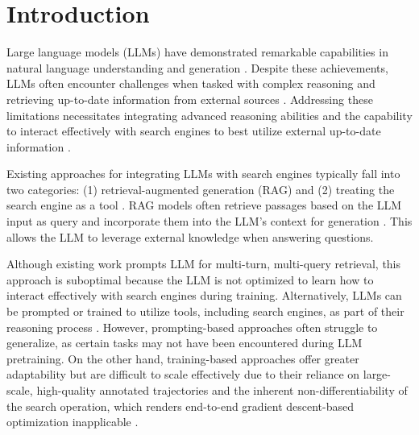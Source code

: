 \section{Introduction}

Large language models (LLMs) have demonstrated remarkable capabilities in natural language understanding and generation \citep{hendrycks2020measuring,clark2018think}.
Despite these achievements, LLMs often encounter challenges when tasked with complex reasoning \citep{wei2022chain} and retrieving up-to-date information from external sources \citep{jin2024long}. Addressing these limitations necessitates integrating advanced reasoning abilities \citep{huang2022towards} and the capability to interact effectively with search engines to best utilize external up-to-date information \citep{schick2023toolformer}.

Existing approaches for integrating LLMs with search engines typically fall into two categories: (1) retrieval-augmented generation (RAG) \citep{gao2023retrieval, lewis2020retrieval} and (2) treating the search engine as a tool \citep{yao2023react, schick2023toolformer}. 
RAG models often retrieve passages based on the LLM input as query and incorporate them into the LLM’s context for generation \citep{lewis2020retrieval}. 
This allows the LLM to leverage external knowledge when answering questions. 

Although existing work \citep{trivedi2022interleaving} prompts LLM for multi-turn, multi-query retrieval, this approach is suboptimal because the LLM is not optimized to learn how to interact effectively with search engines during training.
Alternatively, LLMs can be prompted or trained to utilize tools, including search engines, as part of their reasoning process \citep{qu2025tool, trivedi2022interleaving}. 
However, prompting-based approaches often struggle to generalize, as certain tasks may not have been encountered during LLM pretraining. 
On the other hand, training-based approaches offer greater adaptability but are difficult to scale effectively due to their reliance on large-scale, high-quality annotated trajectories and the inherent non-differentiability of the search operation, which renders end-to-end gradient descent-based optimization inapplicable \citep{schick2023toolformer,asai2024self}.

